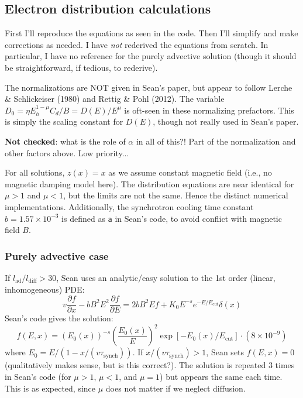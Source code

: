 \documentclass[10pt]{article}
\newcommand{\mt}{\mathrm}
\newcommand{\ptl}{\partial} %
\begin{document}
\subsection{Electron distribution calculations}

First I'll reproduce the equations as seen in the code.  Then I'll 
simplify and make corrections as needed.  I have \emph{not} rederived the
equations from scratch.  In particular, I have no reference for the purely
advective solution (though it should be straightforward, if tedious, to
rederive).



The normalizations are NOT given in Sean's paper, but appear to follow
Lerche \& Schlickeiser (1980) and Rettig \& Pohl (2012).  The variable
$D_0 = \eta E_h^{1-\mu} C_d / B = D(E) / E^\mu$ is oft-seen in these
normalizing prefactors.  This is simply the scaling constant for $D(E)$, though
not really used in Sean's paper.

\textbf{Not checked}: what is the role of $\alpha$ in all of this?!  Part of
the normalization and other factors above.  Low priority...

For all solutions, $z(x) = x$ as we assume constant magnetic field (i.e., no
magnetic damping model here).  The distribution equations are near identical
for $\mu > 1$ and $\mu < 1$, but the limits are not the same.  Hence the
distinct numerical implementations.
Additionally, the synchrotron cooling time constant $b = 1.57 \times 10^{-3}$
is defined as {\tt{a}} in Sean's code, to avoid conflict with magnetic field
$B$.


\subsubsection{Purely advective case}

If $l_{\mt{ad}} / l_{\mt{diff}} > 30$, Sean uses an analytic/easy solution to
the 1st order (linear, inhomogeneous) PDE:
\[
    v \frac{\ptl f}{\ptl x} - b B^2 E^2 \frac{\ptl f}{\ptl E}
    = 2 b B^2 E f + K_0 E^{-s} e^{-E/E_{\mt{cut}}} \delta(x)
\]
Sean's code gives the solution:
\[
    f(E,x) = (E_0(x))^{-s} \left(\frac{E_0(x)}{E}\right)^2
    \exp \left[ -E_0(x)/E_{\mt{cut}} \right] \cdot \left(8\times10^{-9}\right)
\]
where $E_0 = E / (1 - x/(v\tau_{\mt{synch}}))$.
If $x / (v \tau_{\mt{synch}}) > 1$, Sean sets $f(E,x) = 0$ (qualitatively makes
sense, but is this correct?).
The solution is repeated 3 times in Sean's code (for $\mu > 1$, $\mu < 1$, and
$\mu = 1$) but appears the same each time.  This is as expected, since $\mu$
does not matter if we neglect diffusion.
\end{document}
